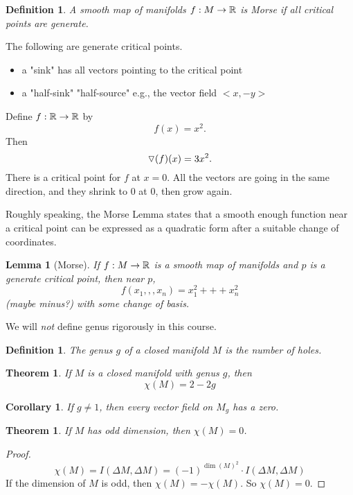 \documentclass[11pt]{amsbook}
\theoremstyle{mystyle} \newtheorem{thrm}[thm]{Theorem}
\theoremstyle{mystyle} \newtheorem{defi}[thm]{Definition}
\theoremstyle{mystyle} \newtheorem{coro}[thm]{Corollary}
\theoremstyle{mystyle} \newtheorem{propo}[thm]{Proposition}
\theoremstyle{mystyle} \newtheorem{lemm}[thm]{Lemma}
\numberwithin{thm}{section}
\newcommand{\de}{\emph}
\begin{document}
\begin{defi}
	A smooth map of manifolds $f: M \to {\mathbb R}$ is \de{Morse} if all critical points are generate.
\end{defi}

\begin{example}
	The following are generate critical points.
	\begin{itemize}
		\item a "sink" has all vectors pointing to the critical point
		\item a "half-sink" "half-source" e.g., the vector field $< x, -y >$
	\end{itemize}
\end{example}

\begin{example}
	Define $f: {\mathbb R} \to {\mathbb R}$ by
	$$f(x) = x^2.$$ Then
	$$\triangledown(f)(x) = 3x^2.$$
	There is a critical point for $f$ at $x = 0$.
	All the vectors are going in the same direction, and they shrink to 0 at 0, then grow again.
\end{example}

Roughly speaking, the Morse Lemma states that a smooth enough function near a critical point can be expressed as a quadratic form after a suitable change of coordinates.

\begin{lemm}[Morse]
	If $f: M \to {\mathbb R}$ is a smooth map of manifolds and $p$ is a generate critical point, then near $p$, $$f(x_1,,,x_n) = x_1^2 +++ x_n^2$$ (maybe minus?) with some change of basis.
\end{lemm}

We will \emph{not} define genus rigorously in this course.

\begin{defi}
	The \de{genus} $g$ of a closed manifold $M$ is the number of holes.
\end{defi}
\begin{thrm}
	If $M$ is a closed manifold with genus $g$, then $$\chi(M) = 2 - 2g$$
\end{thrm}
\begin{coro}
	If $g \neq 1$, then every vector field on $M_g$ has a zero.
\end{coro}

\begin{thrm}
	If $M$ has odd dimension, then $\chi(M) = 0$.
\end{thrm}
\begin{proof}
	$$\chi(M) = I(\Delta M, \Delta M) = (-1)^{\dim(M)^2} \cdot I(\Delta M, \Delta M)$$
	If the dimension of $M$ is odd, then $\chi(M) = -\chi(M)$.
	So $\chi(M) = 0$.
\end{proof}
\end{document}
